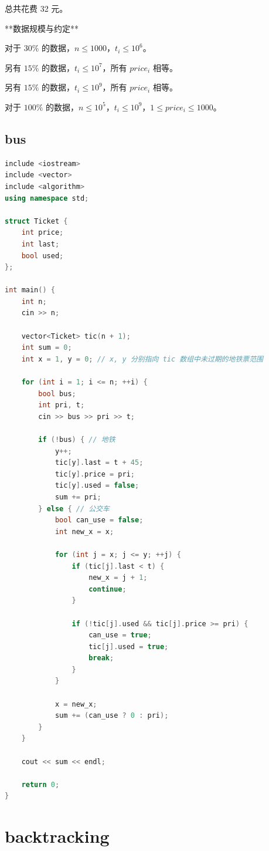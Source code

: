 \documentclass[12pt,twiside,a4paper]{ctexbook}
\numberwithin{chapter}{part}
\begin{document}
总共花费 32 元。 


**数据规模与约定**

对于 $30\%$ 的数据，$n \leq 1000$，$t_i \leq 10^6$。

另有 $15\%$ 的数据，$t_i \leq 10^7$，所有 $price_i$ 相等。

另有 $15\%$ 的数据，$t_i \leq 10^9$，所有 $price_i$ 相等。

对于 $100\%$ 的数据，$n \leq 10^5$，$t_i \leq 10^9$，$1 \leq price_i \leq 1000$。
\section{bus}
\begin{lstlisting}[language=c++,breaklines=true]
include <iostream>
include <vector>
include <algorithm>
using namespace std;

struct Ticket {
    int price;
    int last;
    bool used;
};

int main() {
    int n;
    cin >> n;
    
    vector<Ticket> tic(n + 1);
    int sum = 0;
    int x = 1, y = 0; // x, y 分别指向 tic 数组中未过期的地铁票范围
    
    for (int i = 1; i <= n; ++i) {
        bool bus;
        int pri, t;
        cin >> bus >> pri >> t;
        
        if (!bus) { // 地铁
            y++;
            tic[y].last = t + 45;
            tic[y].price = pri;
            tic[y].used = false;
            sum += pri;
        } else { // 公交车
            bool can_use = false;
            int new_x = x;
            
            for (int j = x; j <= y; ++j) {
                if (tic[j].last < t) {
                    new_x = j + 1;
                    continue;
                }
                
                if (!tic[j].used && tic[j].price >= pri) {
                    can_use = true;
                    tic[j].used = true;
                    break;
                }
            }
            
            x = new_x;
            sum += (can_use ? 0 : pri);
        }
    }
    
    cout << sum << endl;
    
    return 0;
}
\end{lstlisting}

\chapter{backtracking}
\end{document}
